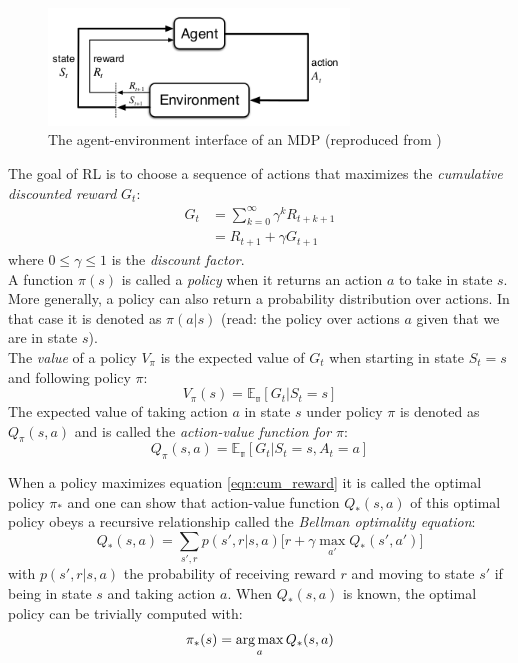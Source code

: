 \begin{figure}[htp]
    \centering
    \includegraphics[width=8cm]{images/mdp.png}
    \caption{The agent-environment interface of an MDP (reproduced from \cite{sutton2018reinforcement})}
    \label{fig:mdp}
\end{figure}

The goal of RL is to choose a sequence of actions that maximizes the \emph{cumulative discounted reward} $G_t$:
\begin{equation}
\begin{split}
    G_t &= \sum_{k=0}^{\infty} \gamma^k R_{t+k+1} \\
        &= R_{t+1} + \gamma G_{t+1}
\end{split}
\label{eqn:cum_reward}
\end{equation}
where $0 \leqslant \gamma \leqslant 1$ is the \emph{discount factor}.\\

A function $\pi(s)$ is called a \emph{policy} when it returns an action $a$ to take in state $s$. More generally, a policy can also return a probability distribution over actions. In that case it is denoted as $\pi(a|s)$ (read: the policy over actions $a$ given that we are in state $s$).\\

The \emph{value} of a policy $V_{\pi}$ is the expected value of $G_t$ when starting in state $S_t=s$ and following policy $\pi$:
\begin{equation}
    V_{\pi}(s) = \mathbb{E_{\pi}}[G_t | S_t=s]
     \label{eq:definition_V}
\end{equation}
The expected value of taking action $a$ in state $s$ under policy $\pi$ is denoted as $Q_{\pi}(s,a)$ and is called the \emph{action-value function for $\pi$}:
\begin{equation}
    Q_{\pi}(s,a) = \mathbb{E_{\pi}}[G_t | S_t=s, A_t = a]
    \label{eq:definition_Q}
\end{equation}

When a policy maximizes equation \ref{eqn:cum_reward} it is called the optimal policy $\pi_{*}$ and one can show that action-value function $Q_{*}(s, a)$ of this optimal policy obeys a recursive relationship called the \emph{Bellman optimality equation}:
\begin{equation}
    Q_{*}(s,a) = \sum_{s', r} p(s', r | s, a) \big[r + \gamma \max_{a'} Q_{*}(s', a') \big]
    \label{eqn:bellman}
\end{equation}
with $p(s', r | s, a)$ the probability of receiving reward $r$ and moving to state $s'$ if being in state $s$ and taking action $a$. When $Q_{*}(s,a)$ is known, the optimal policy can be trivially computed with:
\begin{equation}
    \pi_{*}(s) = \operatorname*{arg\,max}_{a} Q_{*}(s, a)
    \label{eq:optimal_policy}
\end{equation}

